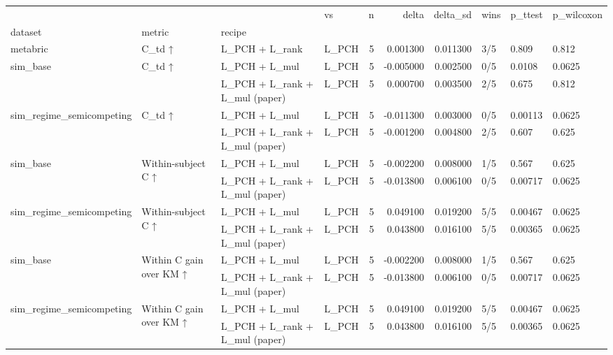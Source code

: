 \begin{tabular}{llllrrrlll}
\toprule
 &  &  & vs & n & delta & delta\_sd & wins & p\_ttest & p\_wilcoxon \\
dataset & metric & recipe &  &  &  &  &  &  &  \\
\midrule
metabric & C\_td ↑ & L\_PCH + L\_rank & L\_PCH & 5 & 0.001300 & 0.011300 & 3/5 & 0.809 & 0.812 \\
\cline{1-10} \cline{2-10}
\multirow[t]{2}{*}{sim\_base} & \multirow[t]{2}{*}{C\_td ↑} & L\_PCH + L\_mul & L\_PCH & 5 & -0.005000 & 0.002500 & 0/5 & 0.0108 & 0.0625 \\
 &  & L\_PCH + L\_rank + L\_mul (paper) & L\_PCH & 5 & 0.000700 & 0.003500 & 2/5 & 0.675 & 0.812 \\
\cline{1-10} \cline{2-10}
\multirow[t]{2}{*}{sim\_regime\_semicompeting} & \multirow[t]{2}{*}{C\_td ↑} & L\_PCH + L\_mul & L\_PCH & 5 & -0.011300 & 0.003000 & 0/5 & 0.00113 & 0.0625 \\
 &  & L\_PCH + L\_rank + L\_mul (paper) & L\_PCH & 5 & -0.001200 & 0.004800 & 2/5 & 0.607 & 0.625 \\
\cline{1-10} \cline{2-10}
\multirow[t]{2}{*}{sim\_base} & \multirow[t]{2}{*}{Within-subject C ↑} & L\_PCH + L\_mul & L\_PCH & 5 & -0.002200 & 0.008000 & 1/5 & 0.567 & 0.625 \\
 &  & L\_PCH + L\_rank + L\_mul (paper) & L\_PCH & 5 & -0.013800 & 0.006100 & 0/5 & 0.00717 & 0.0625 \\
\cline{1-10} \cline{2-10}
\multirow[t]{2}{*}{sim\_regime\_semicompeting} & \multirow[t]{2}{*}{Within-subject C ↑} & L\_PCH + L\_mul & L\_PCH & 5 & 0.049100 & 0.019200 & 5/5 & 0.00467 & 0.0625 \\
 &  & L\_PCH + L\_rank + L\_mul (paper) & L\_PCH & 5 & 0.043800 & 0.016100 & 5/5 & 0.00365 & 0.0625 \\
\cline{1-10} \cline{2-10}
\multirow[t]{2}{*}{sim\_base} & \multirow[t]{2}{*}{Within C gain over KM ↑} & L\_PCH + L\_mul & L\_PCH & 5 & -0.002200 & 0.008000 & 1/5 & 0.567 & 0.625 \\
 &  & L\_PCH + L\_rank + L\_mul (paper) & L\_PCH & 5 & -0.013800 & 0.006100 & 0/5 & 0.00717 & 0.0625 \\
\cline{1-10} \cline{2-10}
\multirow[t]{2}{*}{sim\_regime\_semicompeting} & \multirow[t]{2}{*}{Within C gain over KM ↑} & L\_PCH + L\_mul & L\_PCH & 5 & 0.049100 & 0.019200 & 5/5 & 0.00467 & 0.0625 \\
 &  & L\_PCH + L\_rank + L\_mul (paper) & L\_PCH & 5 & 0.043800 & 0.016100 & 5/5 & 0.00365 & 0.0625 \\

\end{tabular}
